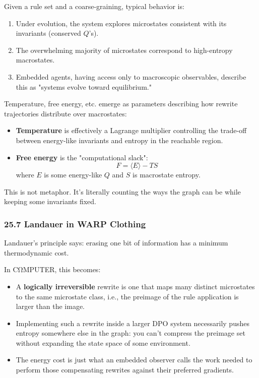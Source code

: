 Given a rule set and a coarse-graining, typical behavior is:

\begin{enumerate}
  \item Under evolution, the system explores microstates consistent with
        its invariants (conserved $Q$’s).
  \item The overwhelming majority of microstates correspond to high-entropy
        macrostates.
  \item Embedded agents, having access only to macroscopic observables, describe
        this as "systems evolve toward equilibrium."
\end{enumerate}

Temperature, free energy, etc. emerge as parameters describing how rewrite
trajectories distribute over macrostates:

\begin{itemize}
  \item \textbf{Temperature} is effectively a Lagrange multiplier controlling the
        trade-off between energy-like invariants and entropy in the reachable region.
  \item \textbf{Free energy} is the "computational slack":
    \[
      F = \langle E \rangle - TS
    \]
    where $E$ is some energy-like $Q$ and $S$ is macrostate entropy.
\end{itemize}

This is not metaphor. It’s literally counting the ways the graph can be while
keeping some invariants fixed.

\subsubsection*{25.7  Landauer in WARP Clothing}

Landauer’s principle says: erasing one bit of information has a minimum
thermodynamic cost.

In CΩMPUTER, this becomes:

\begin{itemize}
  \item A \textbf{logically irreversible} rewrite is one that maps many distinct
        microstates to the same microstate class, i.e., the preimage of the
        rule application is larger than the image.

  \item Implementing such a rewrite inside a larger DPO system necessarily
        pushes entropy somewhere else in the graph: you can’t compress the
        preimage set without expanding the state space of some environment.

  \item The energy cost is just what an embedded observer calls the work needed
        to perform those compensating rewrites against their preferred gradients.
\end{itemize}


